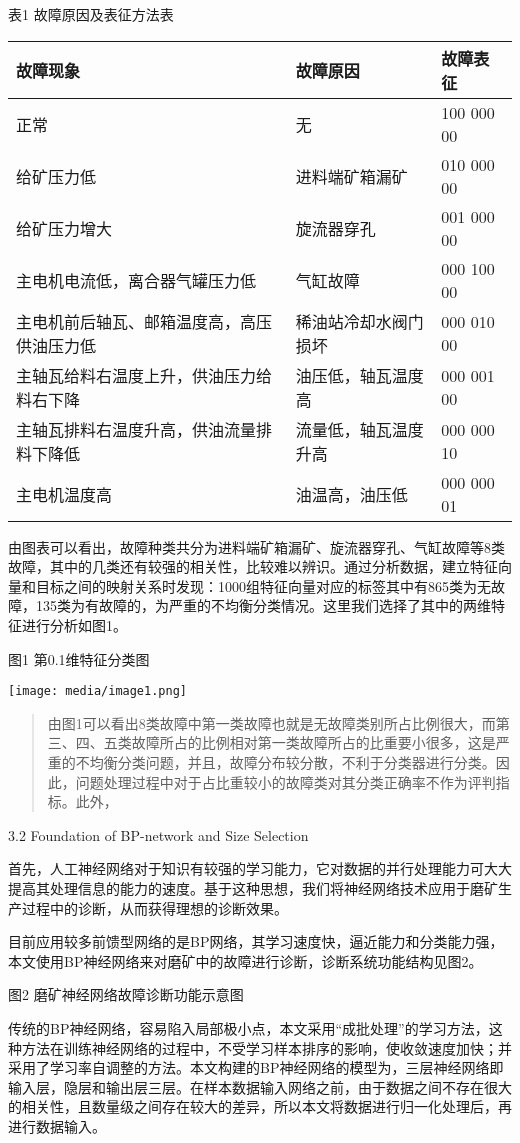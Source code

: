 表1 故障原因及表征方法表

\begin{longtable}[c]{@{}lll@{}}
\toprule
故障现象 & 故障原因 & 故障表征\tabularnewline
\midrule
\endhead
正常 & 无 & 100 000 00\tabularnewline
给矿压力低 & 进料端矿箱漏矿 & 010 000 00\tabularnewline
给矿压力增大 & 旋流器穿孔 & 001 000 00\tabularnewline
主电机电流低，离合器气罐压力低 & 气缸故障 & 000 100 00\tabularnewline
主电机前后轴瓦、邮箱温度高，高压供油压力低 & 稀油站冷却水阀门损坏 & 000
010 00\tabularnewline
主轴瓦给料右温度上升，供油压力给料右下降 & 油压低，轴瓦温度高 & 000 001
00\tabularnewline
主轴瓦排料右温度升高，供油流量排料下降低 & 流量低，轴瓦温度升高 & 000
000 10\tabularnewline
主电机温度高 & 油温高，油压低 & 000 000 01\tabularnewline
\bottomrule
\end{longtable}

由图表可以看出，故障种类共分为进料端矿箱漏矿、旋流器穿孔、气缸故障等8类故障，其中的几类还有较强的相关性，比较难以辨识。通过分析数据，建立特征向量和目标之间的映射关系时发现：1000组特征向量对应的标签其中有865类为无故障，135类为有故障的，为严重的不均衡分类情况。这里我们选择了其中的两维特征进行分析如图1。

图1 第0.1维特征分类图

\texttt{[image: media/image1.png]}

\begin{quote}
由图1可以看出8类故障中第一类故障也就是无故障类别所占比例很大，而第三、四、五类故障所占的比例相对第一类故障所占的比重要小很多，这是严重的不均衡分类问题，并且，故障分布较分散，不利于分类器进行分类。因此，问题处理过程中对于占比重较小的故障类对其分类正确率不作为评判指标。此外，
\end{quote}

3.2 Foundation of BP-network and Size Selection

首先，人工神经网络对于知识有较强的学习能力，它对数据的并行处理能力可大大提高其处理信息的能力的速度。基于这种思想，我们将神经网络技术应用于磨矿生产过程中的诊断，从而获得理想的诊断效果。

目前应用较多前馈型网络的是BP网络，其学习速度快，逼近能力和分类能力强，本文使用BP神经网络来对磨矿中的故障进行诊断，诊断系统功能结构见图2。

图2 磨矿神经网络故障诊断功能示意图

传统的BP神经网络，容易陷入局部极小点，本文采用``成批处理''的学习方法，这种方法在训练神经网络的过程中，不受学习样本排序的影响，使收敛速度加快；并采用了学习率自调整的方法。本文构建的BP神经网络的模型为，三层神经网络即输入层，隐层和输出层三层。在样本数据输入网络之前，由于数据之间不存在很大的相关性，且数量级之间存在较大的差异，所以本文将数据进行归一化处理后，再进行数据输入。

